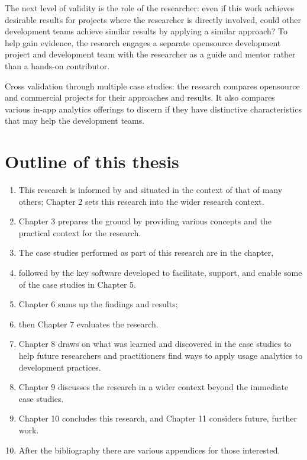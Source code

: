 The next level of validity is the role of the researcher: even if this work achieves desirable results for projects where the researcher is directly involved, could other development teams achieve similar results by applying a similar approach? To help gain evidence, the research engages a separate opensource development project and development team with the researcher as a guide and mentor rather than a hands-on contributor.

Cross validation through multiple case studies: the research compares opensource and commercial projects for their approaches and results. It also compares various in-app analytics offerings to discern if they have distinctive characteristics that may help the development teams.


\section{Outline of this thesis}
\begin{enumerate}
    \item This research is informed by and situated in the context of that of many others; Chapter 2 sets this research into the wider research context.
    \item Chapter 3 prepares the ground by providing various concepts and the practical context for the research.
    \item The case studies performed as part of this research are in the  chapter,
    \item followed by the key software developed to facilitate, support, and enable some of the case studies in Chapter 5.
    \item Chapter 6 sums up the findings and results;
    \item then Chapter 7 evaluates the research.
    \item Chapter 8 draws on what was learned and discovered in the case studies to help future researchers and practitioners find ways to apply usage analytics to development practices.
    \item Chapter 9 discusses the research in a wider context beyond the immediate case studies.
    \item Chapter 10 concludes this research, and Chapter 11 considers future, further work.
    \item After the bibliography there are various appendices for those interested.
\end{enumerate}
